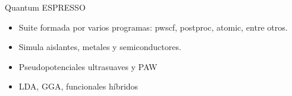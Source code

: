 \begin{frame}{Quantum ESPRESSO}
    \begin{itemize}
        \item Suite formada por varios programas: pwscf, postproc, atomic, entre otros.
        \item Simula aislantes, metales y semiconductores.
        \item Pseudopotenciales ultrasuaves y PAW
        \item LDA, GGA, funcionales h\'ibridos
    \end{itemize}
\end{frame}